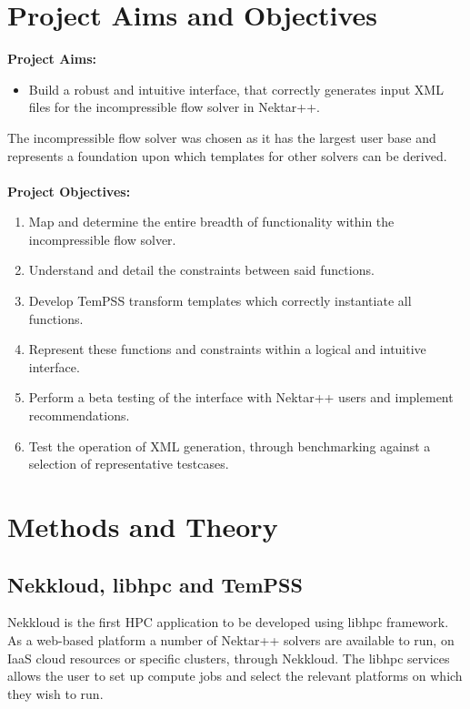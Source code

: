 \documentclass[11pt, a4paper]{report}
\begin{document}
\chapter{Project Aims and Objectives}
\label{chap:proj_spec}
\textbf{Project Aims:}
\begin{itemize}
\item Build a robust and intuitive interface, that correctly generates input XML files for the incompressible flow solver in Nektar++.
\end{itemize}

The incompressible flow solver was chosen as it has the largest user base and represents a foundation upon which templates for other solvers can be derived.
\\ \vspace{.25cm} \\
\textbf{Project Objectives:}
\begin{enumerate}
\item Map and determine the entire breadth of functionality within the incompressible flow solver.
\item Understand and detail the constraints between said functions.
\item Develop TemPSS transform templates which correctly instantiate all functions.
\item Represent these functions and constraints within a logical and intuitive interface.
\item Perform a beta testing of the interface with Nektar++ users and implement recommendations.
\item Test the operation of XML generation, through benchmarking against a selection of representative testcases.
\end{enumerate}

\newpage
\chapter{Methods and Theory}

\section{Nekkloud, libhpc and TemPSS}
Nekkloud is the first HPC application to be developed using libhpc framework. As a web-based platform a number of Nektar++ solvers are available to run, on IaaS cloud resources or specific clusters, through Nekkloud. The libhpc services allows the user to set up compute jobs and select the relevant platforms on which they wish to run.
\end{document}
